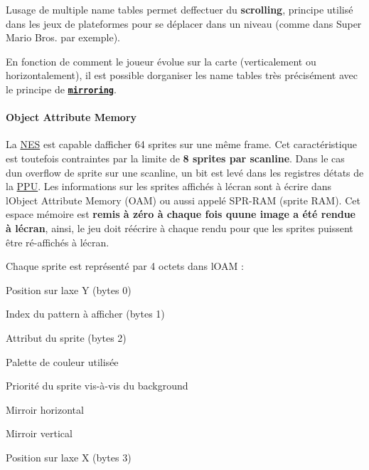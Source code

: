 L\textquotesingle{}usage de multiple name tables permet d\textquotesingle{}effectuer du {\bfseries scrolling}, principe utilisé dans les jeux de plateformes pour se déplacer dans un niveau (comme dans Super Mario Bros. par exemple).



En fonction de comment le joueur évolue sur la carte (verticalement ou horizontalement), il est possible d\textquotesingle{}organiser les name tables très précisément avec le principe de \href{https://wiki.nesdev.com/w/index.php/Mirroring}{\tt {\bfseries mirroring}}.

\paragraph*{Object Attribute Memory}

La \hyperlink{struct_n_e_s}{N\+ES} est capable d\textquotesingle{}afficher 64 sprites sur une même frame. Cet caractéristique est toutefois contraintes par la limite de {\bfseries 8 sprites par scanline}. Dans le cas d\textquotesingle{}un overflow de sprite sur une scanline, un bit est levé dans les registres d\textquotesingle{}états de la \hyperlink{struct_p_p_u}{P\+PU}. Les informations sur les sprites affichés à l\textquotesingle{}écran sont à écrire dans l\textquotesingle{}Object Attribute Memory (O\+AM) ou aussi appelé S\+P\+R-\/\+R\+AM (sprite R\+AM). Cet espace mémoire est {\bfseries remis à zéro à chaque fois qu\textquotesingle{}une image a été rendue à l\textquotesingle{}écran}, ainsi, le jeu doit réécrire à chaque rendu pour que les sprites puissent être ré-\/affichés à l\textquotesingle{}écran.

Chaque sprite est représenté par 4 octets dans l\textquotesingle{}O\+AM \+:
\begin{DoxyItemize}
\item Position sur l\textquotesingle{}axe Y (bytes 0)
\item Index du pattern à afficher (bytes 1)
\item Attribut du sprite (bytes 2)
\begin{DoxyItemize}
\item Palette de couleur utilisée
\item Priorité du sprite vis-\/à-\/vis du background
\item Mirroir horizontal
\item Mirroir vertical
\end{DoxyItemize}
\item Position sur l\textquotesingle{}axe X (bytes 3)
\end{DoxyItemize}


